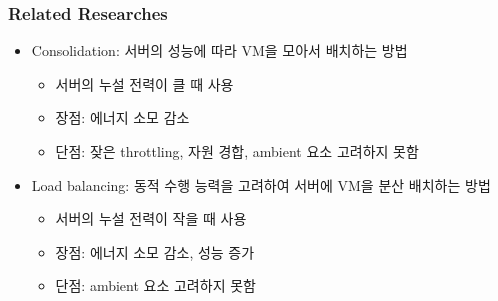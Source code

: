 \subsubsection*{Related Researches}
\begin{itemize}
    \item Consolidation: 서버의 성능에 따라 VM을 모아서 배치하는 방법
    \begin{itemize}
        \item 서버의 누설 전력이 클 때 사용
        \item 장점: 에너지 소모 감소
        \item 단점: 잦은 throttling, 자원 경합, ambient 요소 고려하지 못함
    \end{itemize}
    \item Load balancing: 동적 수행 능력을 고려하여 서버에 VM을 분산 배치하는 방법
    \begin{itemize}
        \item 서버의 누설 전력이 작을 때 사용
        \item 장점: 에너지 소모 감소, 성능 증가
        \item 단점: ambient 요소 고려하지 못함
    \end{itemize}
\end{itemize}

